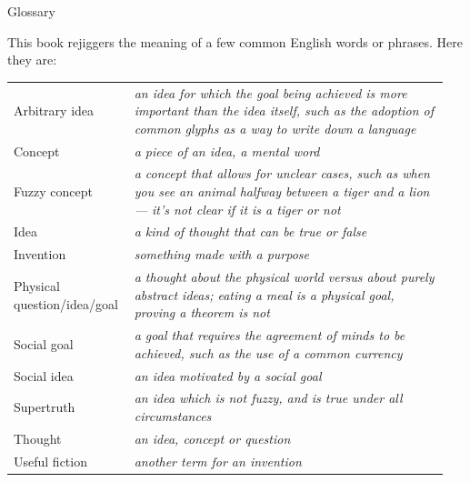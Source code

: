 \documentclass[9pt, twoside]{book}
\theoremstyle{argtstyle}
\begin{document}
\pagebreak

{\huge Glossary}
\bigskip

This book rejiggers the meaning of a few common English words or phrases.
Here they are:
\renewcommand{\arraystretch}{2}
\begin{center}
    \begin{tabular}{>{\raggedleft}p{0.25\linewidth} | p{0.70\linewidth}}
        \hfill
        Arbitrary idea & \em an idea for which the goal being achieved
                             is more important than the idea itself, such as the
                             adoption of common glyphs as a way to write down a
                             language \\
        \hfill
        Concept        & \em a piece of an idea, a mental word \\
        \hfill
        Fuzzy concept  & \em a concept that allows for unclear cases, such
                             as when you see an animal halfway between a tiger
                             and a lion --- it's not clear if it is a tiger or
                             not \\
        \hfill
        Idea           & \em a kind of thought that can be true or false \\
        \hfill
        Invention      & \em something made with a purpose \\
        \hfill
        Physical question/idea/goal & \em a thought about the physical world
                             versus about purely abstract ideas; eating a meal
                             is a physical goal, proving a theorem is not \\
        \hfill
        Social goal    & \em a goal that requires the agreement of minds to be
                             achieved, such as the use of a common currency \\
        \hfill
        Social idea    & \em an idea motivated by a social goal \\
        \hfill
        Supertruth     & \em an idea which is not fuzzy, and is true under all
                             circumstances \\
        \hfill
        Thought        & \em an idea, concept or question \\
        \hfill
        Useful fiction & \em another term for an invention \\
    \end{tabular}
\end{center}
\end{document}
